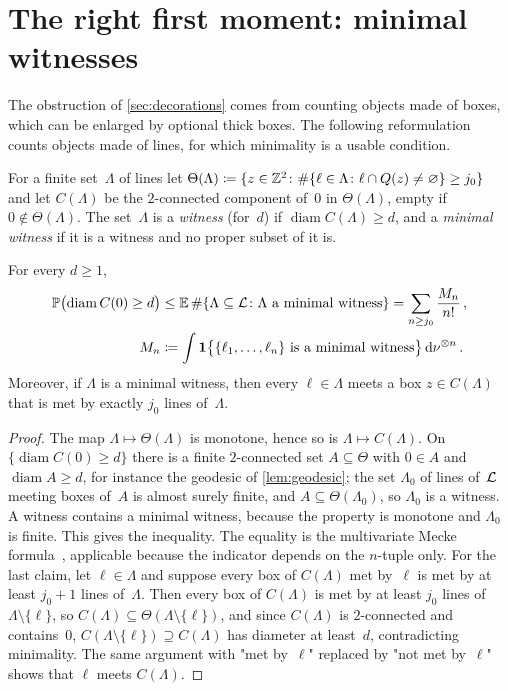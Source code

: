 \documentclass[11pt,letterpaper]{article}
\DeclareMathOperator{\diam}{diam}
\begin{document}
\section{The right first moment: minimal witnesses}
\label{sec:witness}

The obstruction of \cref{sec:decorations} comes from counting objects made of boxes, which can be enlarged by optional thick boxes. The following reformulation counts objects made of lines, for which minimality is a usable condition.

\begin{definition}[Witnesses]
\label{def:witness}
For a finite set~$\Lambda$ of lines let $\Theta(\Lambda)\coloneqq\{z\in\mathbb Z^2\colon\#\{\ell\in\Lambda\colon\ell\cap Q(z)\neq\varnothing\}\ge j_0\}$ and let $C(\Lambda)$ be the $2$-connected component of~$0$ in $\Theta(\Lambda)$, empty if $0\notin\Theta(\Lambda)$. The set~$\Lambda$ is a \emph{witness} (for~$d$) if $\diam C(\Lambda)\ge d$, and a \emph{minimal witness} if it is a witness and no proper subset of it is.
\end{definition}

\begin{proposition}
\label{prop:witness}
For every $d\ge1$,
\begin{align}
\label{eq:witness}
  \P\bigl(\diam C(0)\ge d\bigr)&\le\E\,\#\{\Lambda\subseteq\cL\colon\Lambda\text{ a minimal witness}\}=\sum_{n\ge j_0}\frac{M_n}{n!}\,,\\
\label{eq:Mn}
  M_n&\coloneqq\int\1\bigl\{\{\ell_1,\dots,\ell_n\}\text{ is a minimal witness}\bigr\}\dd\nu^{\otimes n}\,.
\end{align}
Moreover, if $\Lambda$ is a minimal witness, then every $\ell\in\Lambda$ meets a box $z\in C(\Lambda)$ that is met by exactly $j_0$ lines of~$\Lambda$.
\end{proposition}

\begin{proof}
The map $\Lambda\mapsto\Theta(\Lambda)$ is monotone, hence so is $\Lambda\mapsto C(\Lambda)$. On $\{\diam C(0)\ge d\}$ there is a finite $2$-connected set $A\subseteq\Theta$ with $0\in A$ and $\diam A\ge d$, for instance the geodesic of \cref{lem:geodesic}; the set $\Lambda_0$ of lines of~$\mathcal L$ meeting boxes of~$A$ is almost surely finite, and $A\subseteq\Theta(\Lambda_0)$, so $\Lambda_0$ is a witness. A witness contains a minimal witness, because the property is monotone and $\Lambda_0$ is finite. This gives the inequality. The equality is the multivariate Mecke formula~\cite[Theorem~4.4]{LP17}, applicable because the indicator depends on the $n$-tuple only. For the last claim, let $\ell\in\Lambda$ and suppose every box of $C(\Lambda)$ met by~$\ell$ is met by at least $j_0+1$ lines of~$\Lambda$. Then every box of $C(\Lambda)$ is met by at least $j_0$ lines of $\Lambda\setminus\{\ell\}$, so $C(\Lambda)\subseteq\Theta(\Lambda\setminus\{\ell\})$, and since $C(\Lambda)$ is $2$-connected and contains~$0$, $C(\Lambda\setminus\{\ell\})\supseteq C(\Lambda)$ has diameter at least~$d$, contradicting minimality. The same argument with "met by~$\ell$" replaced by "not met by~$\ell$" shows that $\ell$ meets $C(\Lambda)$.
\end{proof}
\end{document}
